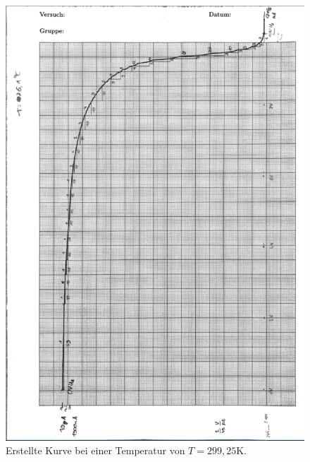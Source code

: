 \begin{figure}[H]
  \centering
  \includegraphics{a.PNG}
  \caption{Erstellte Kurve bei einer Temperatur von $T=299,25$K. }
  \label{fig:plot}
\end{figure}
